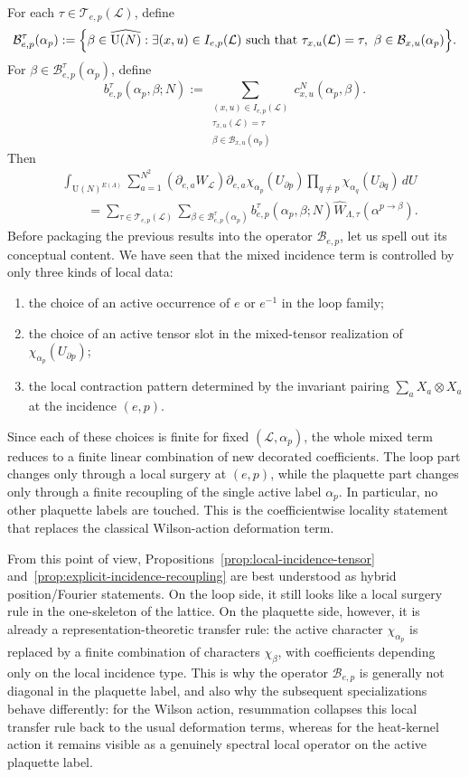 \documentclass[11pt,a4paper,reqno]{article}
\theoremstyle{definition}
\theoremstyle{remark}
\newcommand\U{{\mathrm U}}
\newcommand\Lc{{\mathcal{L}}}
\newcommand\B{{\mathcal{B}}}
\begin{document}
For each $\tau\in \mathcal T_{e,p}(\Lc)$, define
\[
\B^\tau_{e,p}(\alpha_p):=\Bigl\{\beta\in \widehat{\U(N)}:\exists (x,u)\in I_{e,p}(\Lc)\text{ such that }\tau_{x,u}(\Lc)=\tau,\ \beta\in \B_{x,u}(\alpha_p)\Bigr\}.
\]
For $\beta\in \B^\tau_{e,p}(\alpha_p)$, define
\[
b^\tau_{e,p}(\alpha_p,\beta;N):=\sum_{\substack{(x,u)\in I_{e,p}(\Lc)\\ \tau_{x,u}(\Lc)=\tau\\ \beta\in \B_{x,u}(\alpha_p)}}c^N_{x,u}(\alpha_p,\beta).
\]
Then
\begin{align*}
&\int_{\U(N)^{E(\Lambda)}}
\sum_{a=1}^{N^2}(\partial_{e,a}W_\Lc)
\partial_{e,a}\chi_{\alpha_p}(U_{\partial p})
\prod_{q\neq p}\chi_{\alpha_q}(U_{\partial q})\,dU\\
&\qquad=
\sum_{\tau\in \mathcal T_{e,p}(\Lc)}
\sum_{\beta\in \B^\tau_{e,p}(\alpha_p)}
b^\tau_{e,p}(\alpha_p,\beta;N)
\widehat{W}_{\Lambda,\tau}(\alpha^{p\to\beta}).
\end{align*}
Before packaging the previous results into the operator $\mathscr{B}_{e,p}$, let us spell out its conceptual content. We have seen that the mixed incidence term is controlled by only three kinds of local data:
\begin{enumerate}
\item the choice of an active occurrence of $e$ or $e^{-1}$ in the loop family;
\item the choice of an active tensor slot in the mixed-tensor realization of
$\chi_{\alpha_p}(U_{\partial p})$;
\item the local contraction pattern determined by the invariant pairing
$\sum_a X_a \otimes X_a$ at the incidence $(e,p)$.
\end{enumerate}

Since each of these choices is finite for fixed $(\Lc,\alpha_p)$, the whole mixed term reduces to a finite linear combination of new decorated coefficients. The loop part changes only through a local surgery at $(e,p)$, while the plaquette part changes only through a finite recoupling of the single active label $\alpha_p$. In particular, no other plaquette labels are touched. This is the coefficientwise locality statement that replaces the classical Wilson-action deformation term.

From this point of view, Propositions~\ref{prop:local-incidence-tensor} and~\ref{prop:explicit-incidence-recoupling} are best understood as hybrid position/Fourier statements. On the loop side, it still looks like a local surgery rule in the one-skeleton of the lattice. On the plaquette side, however, it is already a representation-theoretic transfer rule: the active character $\chi_{\alpha_p}$ is replaced by a finite combination of characters $\chi_\beta$, with coefficients depending only on the local incidence type. This is why the operator $\mathscr{B}_{e,p}$ is generally not diagonal in the plaquette label, and also why the subsequent specializations behave differently: for the Wilson action, resummation collapses this local transfer rule back to the usual deformation terms, whereas for the heat-kernel action it remains visible as a genuinely spectral local operator on the active plaquette label.
\end{document}
